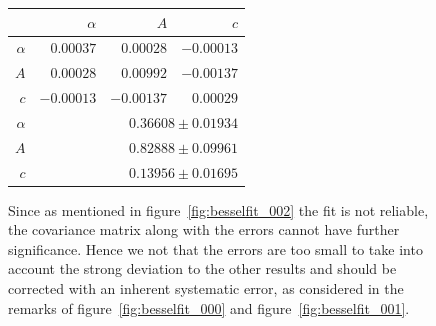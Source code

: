 \begin{figure}
\caption{
Since as mentioned in figure~\ref{fig:besselfit_002} the fit is not reliable, the
covariance matrix along with the errors cannot have further significance.
Hence we not that the errors are too small to take into account the strong deviation to the
other results and should be corrected with an inherent systematic error, as considered in
the remarks of figure~\ref{fig:besselfit_000} and figure~\ref{fig:besselfit_001}.
}
 \begin{tabular}{|r|r|r|r|}
 \hline 
\cellcolor{tabcolor}&\cellcolor{tabcolor}$\alpha$&\cellcolor{tabcolor}$A$&\cellcolor{tabcolor}$c$\\ \hline 
 \cellcolor{tabcolor}$\alpha$&$0.00037$ &$0.00028$ &$-0.00013$ \\ 
\cellcolor{tabcolor}$A$&$0.00028$ &$0.00992$ &$-0.00137$ \\ 
\cellcolor{tabcolor}$c$&$-0.00013$ &$-0.00137$ &$0.00029$ \\ \hline \hline
\cellcolor{tabcolor}$\alpha$&\multicolumn{3}{r|}{$0.36608 \pm 0.01934$ }\\ 
\cellcolor{tabcolor}$A$&\multicolumn{3}{r|}{$0.82888 \pm 0.09961$ }\\ 
\cellcolor{tabcolor}$c$&\multicolumn{3}{r|}{$0.13956 \pm 0.01695$ }\\ 
\hline
\end{tabular}
\end{figure}
\newpage
\clearpage
